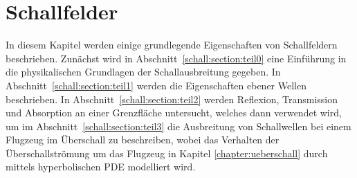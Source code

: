 %
%
%
%
\chapter{Schallfelder\label{chapter:schall}}
\begin{refsection}

\begin{comment}
Ein paar Hinweise für die korrekte Formatierung des Textes
\begin{itemize}
\item
Absätze werden gebildet, indem man eine Leerzeile einfügt.
Die Verwendung von \verb+\\+ ist nur in Tabellen und Arrays gestattet.
\item
Die explizite Platzierung von Bildern ist nicht erlaubt, entsprechende
Optionen werden gelöscht. 
Verwenden Sie Labels und Verweise, um auf Bilder hinzuweisen.
\item
Beginnen Sie jeden Satz auf einer neuen Zeile. 
Damit ermöglichen Sie dem Versionsverwaltungssysteme, Änderungen
in verschiedenen Sätzen von verschiedenen Autoren ohne Konflikt 
anzuwenden.
\item 
Bilden Sie auch für Formeln kurze Zeilen, einerseits der besseren
Übersicht wegen, aber auch um GIT die Arbeit zu erleichtern.
\end{itemize}

\end{comment}

In diesem Kapitel werden einige grundlegende Eigenschaften von
Schallfeldern beschrieben.
Zunächst wird in Abschnitt~\ref{schall:section:teil0} eine Einführung
in die physikalischen Grundlagen der Schallausbreitung gegeben.
In Abschnitt~\ref{schall:section:teil1} werden die Eigenschaften
ebener Wellen beschrieben.
In Abschnitt~\ref{schall:section:teil2} werden Reflexion, Transmission
und Absorption an einer Grenzfläche untersucht, welches dann verwendet
wird, um im Abschnitt~\ref{schall:section:teil3} die Ausbreitung
von Schallwellen bei einem Flugzeug im Überschall zu beschreiben, wobei
das Verhalten der Überschallströmung um das Flugzeug in Kapitel
\ref{chapter:ueberschall} durch mittels hyperbolischen PDE modelliert wird.






\printbibliography[heading=subbibliography]
\end{refsection}
